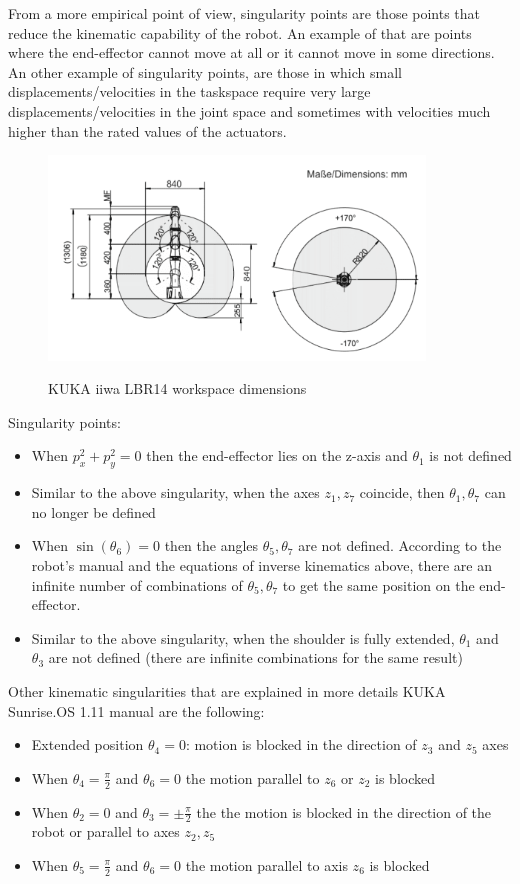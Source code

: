 From a more empirical point of view, singularity points are those points that reduce the kinematic capability of the robot. An example of that are points where the end-effector cannot move at all or it cannot move in some 
directions. An other example of singularity points, are those in which small displacements/velocities in the taskspace require very large displacements/velocities in the joint space and sometimes with velocities much higher 
than the rated values of the actuators.

\begin{center}
\begin{figure}[!htb]
\centering
\includegraphics[width=10cm]{images/iiwa-workspace.png}\\
\caption{KUKA iiwa LBR14 workspace dimensions}
\end{figure}
\end{center}

Singularity points:
\begin{itemize}
	\item When $p_x^2 + p_y^2 = 0$ then the end-effector lies on the z-axis and $θ_1$ is not defined
	\item Similar to the above singularity, when the axes $z_1,z_7$ coincide, then $θ_1,θ_7$ can no longer be defined
	\item When $\sin\left( θ_6 \right) = 0$ then the angles $θ_5, θ_7$ are not defined. According to the robot's manual and the equations of inverse kinematics above, there are an infinite number of combinations of
	$θ_5, θ_7$ to get the same position on the end-effector.
	\item Similar to the above singularity, when the shoulder is fully extended, $θ_1$ and $θ_3$ are not defined (there are infinite combinations for the same result)
\end{itemize}
Other kinematic singularities that are explained in more details KUKA Sunrise.OS 1.11 manual are the following:
\begin{itemize}
	\item Extended position $θ_4 = 0$: motion is blocked in the direction of $z_3$ and $z_5$ axes
	\item When $θ_4 = \frac{π}{2}$ and $θ_6 = 0$ the motion parallel to $z_6$ or $z_2$ is blocked
	\item When $θ_2 = 0$ and $θ_3 = \pm \frac{π}{2}$ the the motion is blocked in the direction of the robot or parallel to axes $z_2,z_5$
	\item When $θ_5 = \frac{π}{2}$ and $θ_6 = 0$ the motion parallel to axis $z_6$ is blocked
\end{itemize}

